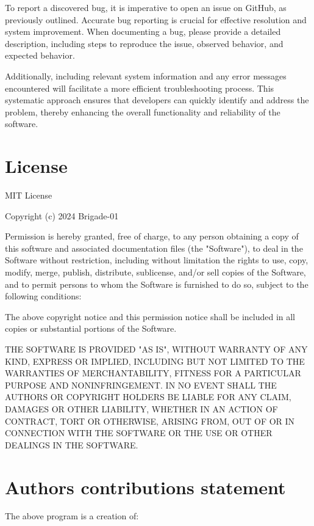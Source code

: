 \documentclass[unnumsec,webpdf,contemporary,large]{oup-authoring-template}%
\theoremstyle{thmstyleone}%
\theoremstyle{thmstyletwo}%
\theoremstyle{thmstylethree}%
\begin{document}
To report a discovered bug, it is imperative to open an issue on GitHub, as previously outlined. Accurate bug reporting is crucial for effective resolution and system improvement. When documenting a bug, please provide a detailed description, including steps to reproduce the issue, observed behavior, and expected behavior. 
\vspace{0.2cm}

Additionally, including relevant system information and any error messages encountered will facilitate a more efficient troubleshooting process. This systematic approach ensures that developers can quickly identify and address the problem, thereby enhancing the overall functionality and reliability of the software.


\section{License}
MIT License

\vspace{0,5em}

Copyright (c) 2024 Brigade-01
\vspace{0,5em}

Permission is hereby granted, free of charge, to any person obtaining a copy
of this software and associated documentation files (the "Software"), to deal
in the Software without restriction, including without limitation the rights
to use, copy, modify, merge, publish, distribute, sublicense, and/or sell
copies of the Software, and to permit persons to whom the Software is
furnished to do so, subject to the following conditions:

\vspace{0,5em}

The above copyright notice and this permission notice shall be included in all
copies or substantial portions of the Software.

\vspace{0,5em}

THE SOFTWARE IS PROVIDED "AS IS", WITHOUT WARRANTY OF ANY KIND, EXPRESS OR
IMPLIED, INCLUDING BUT NOT LIMITED TO THE WARRANTIES OF MERCHANTABILITY,
FITNESS FOR A PARTICULAR PURPOSE AND NONINFRINGEMENT. IN NO EVENT SHALL THE
AUTHORS OR COPYRIGHT HOLDERS BE LIABLE FOR ANY CLAIM, DAMAGES OR OTHER
LIABILITY, WHETHER IN AN ACTION OF CONTRACT, TORT OR OTHERWISE, ARISING FROM,
OUT OF OR IN CONNECTION WITH THE SOFTWARE OR THE USE OR OTHER DEALINGS IN THE
SOFTWARE.

\section{Authors contributions statement}
The above program is a creation of:
\end{document}
